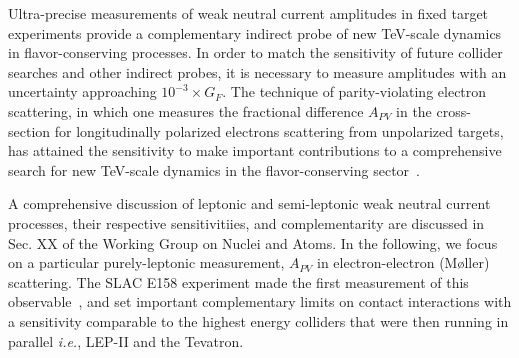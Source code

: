 
Ultra-precise measurements of weak neutral current amplitudes in fixed target experiments provide a complementary indirect probe of new TeV-scale dynamics in flavor-conserving processes.
In order to match the sensitivity of future collider
searches and other indirect probes, it is necessary to measure amplitudes with an uncertainty
approaching $10^{-3}\times G_F$. The technique of parity-violating electron scattering, in which one measures
the fractional difference $A_{PV}$ in the cross-section for longitudinally polarized electrons scattering from
unpolarized  targets, has attained the sensitivity to make important contributions to a comprehensive search for new 
TeV-scale dynamics in the flavor-conserving sector~\cite{ref:cl:kkannualreview}. 

A comprehensive discussion of leptonic and semi-leptonic weak neutral current processes, their respective 
sensitivitiies, and complementarity are discussed in Sec. XX of the Working Group on Nuclei and Atoms. 
In the following, we focus on a particular purely-leptonic  measurement, 
$A_{PV}$ in electron-electron (M\o ller) scattering.  
The SLAC E158 experiment made the first measurement of this observable~\cite{ref:cl:Anthony:2005pm}, 
and set
important complementary limits on contact interactions with a sensitivity comparable to the highest energy
colliders that were then running in parallel {\it i.e.}, LEP-II and the Tevatron. 

